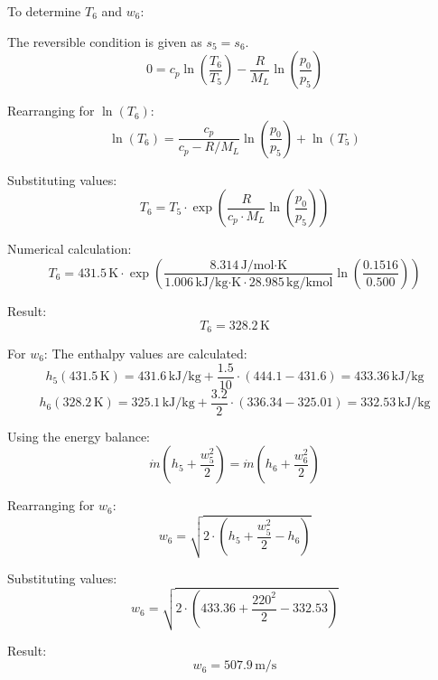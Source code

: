 To determine \( T_6 \) and \( w_6 \):  

The reversible condition is given as \( s_5 = s_6 \).  
\[
0 = c_p \ln \left( \frac{T_6}{T_5} \right) - \frac{R}{M_L} \ln \left( \frac{p_0}{p_5} \right)
\]

Rearranging for \( \ln(T_6) \):  
\[
\ln(T_6) = \frac{c_p}{c_p - R/M_L} \ln \left( \frac{p_0}{p_5} \right) + \ln(T_5)
\]

Substituting values:  
\[
T_6 = T_5 \cdot \exp \left( \frac{R}{c_p \cdot M_L} \ln \left( \frac{p_0}{p_5} \right) \right)
\]

Numerical calculation:  
\[
T_6 = 431.5 \, \text{K} \cdot \exp \left( \frac{8.314 \, \text{J/mol·K}}{1.006 \, \text{kJ/kg·K} \cdot 28.985 \, \text{kg/kmol}} \ln \left( \frac{0.1516}{0.500} \right) \right)
\]

Result:  
\[
T_6 = 328.2 \, \text{K}
\]

For \( w_6 \):  
The enthalpy values are calculated:  
\[
h_5(431.5 \, \text{K}) = 431.6 \, \text{kJ/kg} + \frac{1.5}{10} \cdot (444.1 - 431.6) = 433.36 \, \text{kJ/kg}
\]
\[
h_6(328.2 \, \text{K}) = 325.1 \, \text{kJ/kg} + \frac{3.2}{2} \cdot (336.34 - 325.01) = 332.53 \, \text{kJ/kg}
\]

Using the energy balance:  
\[
\dot{m} \left( h_5 + \frac{w_5^2}{2} \right) = \dot{m} \left( h_6 + \frac{w_6^2}{2} \right)
\]

Rearranging for \( w_6 \):  
\[
w_6 = \sqrt{2 \cdot \left( h_5 + \frac{w_5^2}{2} - h_6 \right)}
\]

Substituting values:  
\[
w_6 = \sqrt{2 \cdot \left( 433.36 + \frac{220^2}{2} - 332.53 \right)}
\]

Result:  
\[
w_6 = 507.9 \, \text{m/s}
\]